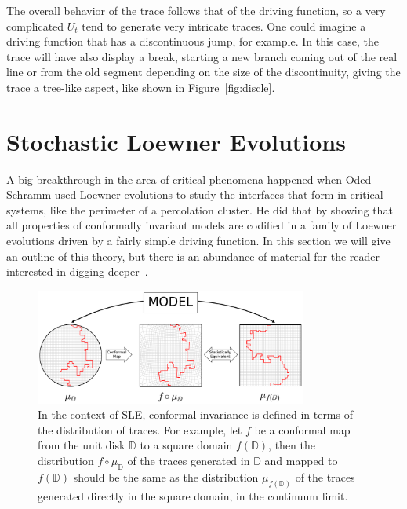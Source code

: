 The overall behavior of the trace follows that of the driving function, so a
very complicated $U_t$ tend to generate very intricate traces. One could
imagine a driving function that has a discontinuous jump, for example. In this
case, the trace will have also display a break, starting a new branch coming
out of the real line or from the old segment depending on the size of the
discontinuity, giving the trace a tree-like aspect, like shown in
Figure~\ref{fig:discle}.

\section{Stochastic Loewner Evolutions}
\label{sec:sle}

A big breakthrough in the area of critical phenomena happened when Oded Schramm
used Loewner evolutions to study the interfaces that form in critical systems,
like the perimeter of a percolation cluster. He did that by showing that all
properties of conformally invariant models are codified in a family of Loewner
evolutions driven by a fairly simple driving function. In this section we will
give an outline of this theory, but there is an abundance of material for the
reader interested in digging deeper~\cite{Cardy2005, Kager2004, Henkel2012}.

\begin{figure}[b]
\begin{center}
    \includegraphics[width=0.8\textwidth]{chapters/ch4-sle/figs/sle_confinv}
\end{center}
\caption{In the context of SLE, conformal invariance is defined in terms of the
    distribution of traces. For example, let $f$ be a conformal map from the
    unit disk $\mathbb{D}$ to a square domain $f(\mathbb{D})$, then the
    distribution $f\circ\mu_\mathbb{D}$ of the traces generated in $\mathbb{D}$
    and mapped to $f(\mathbb{D})$ should be the same as the distribution
    $\mu_{f(\mathbb{D})}$ of the traces generated directly in the square
    domain, in the continuum limit.}
\label{fig:confinv}
\end{figure}

